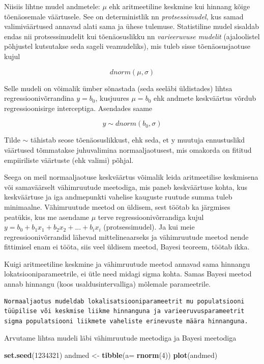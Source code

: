 \documentclass[]{book}
\newenvironment{Shaded}{\begin{snugshade}}{\end{snugshade}}
\newcommand{\DataTypeTok}[1]{\textcolor[rgb]{0.13,0.29,0.53}{#1}}
\newcommand{\DecValTok}[1]{\textcolor[rgb]{0.00,0.00,0.81}{#1}}
\newcommand{\KeywordTok}[1]{\textcolor[rgb]{0.13,0.29,0.53}{\textbf{#1}}}
\newcommand{\NormalTok}[1]{#1}
\newcommand{\StringTok}[1]{\textcolor[rgb]{0.31,0.60,0.02}{#1}}
\begin{document}
Niisiis lihtne mudel andmetele: \(\mu\) ehk aritmeetiline keskmine kui hinnang kõige tõenäosemale väärtusele. See on deterministlik nn \emph{protsessimudel}, kus samad valimiväärtused annavad alati sama ja ühese tulemuse. Statistiline mudel sisaldab endas nii protsessimudelit kui tõenäosuslikku nn \emph{varieeruvuse mudelit} (ajaloolistel põhjustel kutsutakse seda sageli veamudeliks), mis tuleb sisse tõenäosusjaotuse kujul

\[dnorm(\mu, \sigma)\]

Selle mudeli on võimalik ümber sõnastada (seda seeläbi üldistades) lihtsa regressioonivõrrandina \(y = b_0\), kusjuures \(\mu = b_0\) ehk andmete keskväärtus võrdub regressioonisirge interceptiga. Asendades saame

\[y \sim dnorm(b_0, \sigma)\]

Tilde \(\sim\) tähistab seose tõenäosuslikkust, ehk seda, et y muutuja ennustuslikd väärtused tõmmatakse juhuvalimina normaaljaotusest, mis omakorda on fititud empiiriliste väärtuste (ehk valimi) põhjal.

Seega on meil normaaljaotuse keskväärtus võimalik leida aritmeetilise keskmisena või samaväärselt vähimruutude meetodiga, mis paneb keskväärtuse kohta, kus keskväärtuse ja iga andmepunkti vahelise kauguste ruutude summa tuleb minimaalne. Vähimruutude meetod on üldisem, sest töötab ka järgmises peatükis, kus me asendame \(\mu\) terve regressioonivõrrandiga kujul \(y = b_0 + b_1x_1 + b_2x_2 + ... + b_ix_i\) (protsessimudel). Ja kui meie regressioonivõrrandid lähevad mittelineaarseks ja vähimruutude meetod nende fittimisel enam ei tööta, siis veel üldisem meetod, Bayesi teoreem, töötab ikka.

Kuigi aritmeetiline keskmine ja vähimruutude meetod annavad sama hinnangu lokatsiooniparameetrile, ei ütle need midagi sigma kohta. Samas Bayesi meetod annab hinnangu (koos usaldusintervalliga) mõlemale parameetrile.

\begin{verbatim}
Normaaljaotus mudeldab lokalisatsiooniparameetrit mu populatsiooni 
tüüpilise või keskmise liikme hinnanguna ja varieeruvusparameetrit 
sigma populatsiooni liikmete vaheliste erinevuste määra hinnanguna. 
\end{verbatim}

Arvutame lihtsa mudeli läbi vähimruutude meetodiga ja Bayesi meetodiga

\begin{Shaded}
\begin{Highlighting}[]
\KeywordTok{set.seed}\NormalTok{(}\DecValTok{1234321}\NormalTok{)}
\NormalTok{andmed <-}\StringTok{ }\KeywordTok{tibble}\NormalTok{(}\DataTypeTok{a=} \KeywordTok{rnorm}\NormalTok{(}\DecValTok{4}\NormalTok{))}
\KeywordTok{plot}\NormalTok{(andmed)}
\end{Highlighting}
\end{Shaded}
\end{document}
